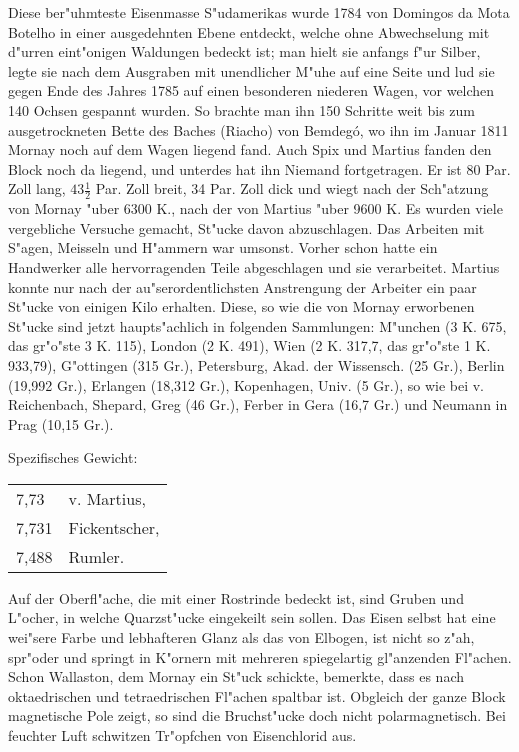 \documentclass[a4paper, 11pt, oneside]{article}
\begin{document}
Diese ber"uhmteste Eisenmasse S"udamerikas wurde 1784 von Domingos da Mota Botelho in einer ausgedehnten Ebene entdeckt, welche ohne Abwechselung mit d"urren eint"onigen Waldungen bedeckt ist; man hielt sie anfangs f"ur Silber, legte sie nach dem Ausgraben mit unendlicher M"uhe auf eine Seite und lud sie gegen Ende des Jahres 1785 auf einen besonderen niederen Wagen, vor welchen 140 Ochsen gespannt wurden. So brachte man ihn 150 Schritte weit bis zum ausgetrockneten Bette des Baches (Riacho) von Bemdegó, wo ihn im Januar 1811 Mornay noch auf dem Wagen liegend fand. Auch Spix und Martius fanden den Block noch da liegend, und unterdes hat ihn Niemand fortgetragen. Er ist 80 Par. Zoll lang, $43\frac{1}{2}$ Par. Zoll breit, 34 Par. Zoll dick und wiegt nach der Sch"atzung von Mornay "uber 6300 K., nach der von Martius "uber 9600 K. Es wurden viele vergebliche Versuche gemacht, St"ucke davon abzuschlagen. Das Arbeiten mit S"agen, Meisseln und H"ammern war umsonst. Vorher schon hatte ein Handwerker alle hervorragenden Teile abgeschlagen und sie verarbeitet. Martius konnte nur nach der au"serordentlichsten Anstrengung der Arbeiter ein paar St"ucke von einigen Kilo erhalten. Diese, so wie die von Mornay erworbenen St"ucke sind jetzt haupts"achlich in folgenden Sammlungen: M"unchen (3 K. 675, das gr"o"ste 3 K. 115), London (2 K. 491), Wien (2 K. 317,7, das gr"o"ste 1 K. 933,79), G"ottingen (315 Gr.), Petersburg, Akad. der Wissensch. (25 Gr.), Berlin (19,992 Gr.), Erlangen (18,312 Gr.), Kopenhagen, Univ. (5 Gr.), so wie bei v. Reichenbach, Shepard, Greg (46 Gr.), Ferber in Gera (16,7 Gr.) und Neumann in Prag (10,15 Gr.).

Spezifisches Gewicht:  
\begin{table}[!ht]
    \centering
    \begin{tabular}{l l}
        7,73 & v. Martius,\\
        7,731 & Fickentscher,\\
        7,488 & Rumler.
    \end{tabular}
\end{table}

Auf der Oberfl"ache, die mit einer Rostrinde bedeckt ist, sind Gruben und L"ocher, in welche Quarzst"ucke eingekeilt sein sollen. Das Eisen selbst hat eine wei"sere Farbe und lebhafteren Glanz als das von Elbogen, ist nicht so z"ah, spr"oder und springt in K"ornern mit mehreren spiegelartig gl"anzenden Fl"achen. Schon Wallaston, dem Mornay ein St"uck schickte, bemerkte, dass es nach oktaedrischen und tetraedrischen Fl"achen spaltbar ist. Obgleich der ganze Block magnetische Pole zeigt, so sind die Bruchst"ucke doch nicht polarmagnetisch. Bei feuchter Luft schwitzen Tr"opfchen von Eisenchlorid aus.
\end{document}
